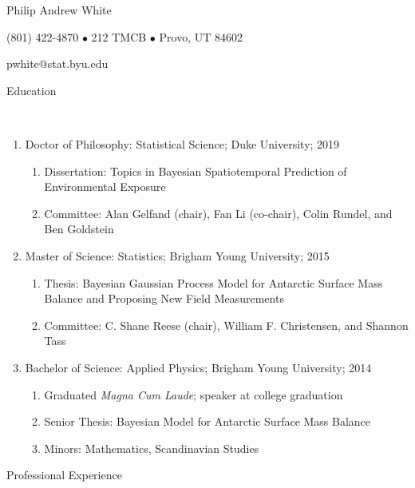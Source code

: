 \documentclass[12pt]{article}
\newcommand{\head}[1]{ %
    \bigskip %
    \begin{large}\begin{bf}{#1}\end{bf}\end{large} %

    \ \\ [-1.3cm] %

    \hrulefill}
\begin{document}

\centerline{ \LARGE Philip Andrew White }
\smallskip
\centerline{ (801) 422-4870 $\bullet$ 212 TMCB $\bullet$ Provo, UT 84602 }
\smallskip
\centerline{pwhite@stat.byu.edu }
\smallskip


\head{Education}

\begin{enumerate}[label=$\bullet$]
\item Doctor of Philosophy: Statistical Science; Duke University; 2019
\begin{enumerate}[label=$\cdot$]
\item Dissertation: Topics in Bayesian Spatiotemporal Prediction of Environmental Exposure
\item Committee: Alan Gelfand (chair), Fan Li (co-chair), Colin Rundel, and Ben Goldstein
\end{enumerate}

\item Master of Science: Statistics; Brigham Young University; 2015

\begin{enumerate}[label=$\cdot$]
\item Thesis: Bayesian Gaussian Process Model for Antarctic Surface Mass Balance and Proposing New Field Measurements
\item  Committee: C. Shane Reese (chair), William F. Christensen, and Shannon Tass
\end{enumerate}

\item Bachelor of Science: Applied Physics; Brigham Young University; 2014 

\begin{enumerate}[label=$\cdot$]
\item Graduated \emph{Magna Cum Laude}; speaker at college graduation
\item Senior Thesis: Bayesian Model for Antarctic Surface Mass Balance
\item Minors: Mathematics, Scandinavian Studies
\end{enumerate}
\end{enumerate}


\head{Professional Experience}
\end{document}
